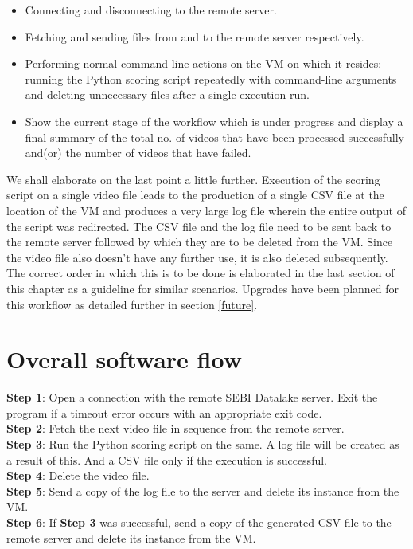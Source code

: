 \begin{itemize}
 \item Connecting and disconnecting to the remote server.
 \item Fetching and sending files from and to the remote server respectively.
 \item Performing normal command-line actions on the VM on which it resides: running the Python scoring script repeatedly with command-line arguments and deleting unnecessary files after a single execution run.
 \item Show the current stage of the workflow which is under progress and display a final summary of the total no. of videos that have been processed successfully and(or) the number of videos that have failed.

\end{itemize}

We shall elaborate on the last point a little further. Execution of the scoring script on a single video file leads to the production of a single CSV file at the location of the VM and produces a very large log file wherein the entire output of the script was redirected. The CSV file and the log file need to be sent back to the remote server followed by which they are to be deleted from the VM. Since the video file also doesn’t have any further use, it is also deleted subsequently. The correct order in which this is to be done is elaborated in the last section of this chapter as a guideline for similar scenarios. Upgrades have been planned for this workflow as detailed further in section \ref{future}.


\section{Overall software flow}

\textbf{Step 1}: Open a connection with the remote SEBI Datalake server. Exit the program if a timeout error occurs with an appropriate exit code. \\[5mm]
\textbf{Step 2}: Fetch the next video file in sequence from the remote server. \\[5mm]
\textbf{Step 3}: Run the Python scoring script on the same. A log file will be created as a result of this. And a CSV file only if the execution is successful. \\[5mm]
\textbf{Step 4}: Delete the video file. \\[5mm]
\textbf{Step 5}: Send a copy of the log file to the server and delete its instance from the VM. \\[5mm]
\textbf{Step 6}: If \textbf{Step 3} was successful, send a copy of the generated CSV file to the remote server and delete its instance from the VM.


